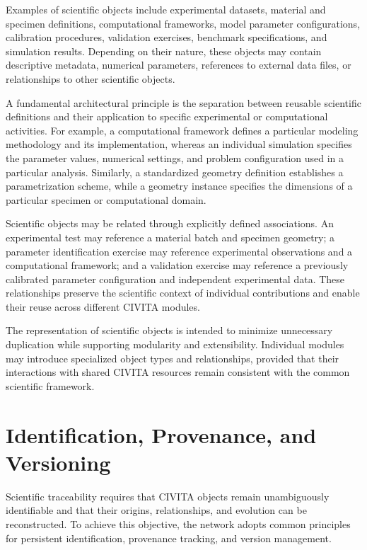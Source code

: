 Examples of scientific objects include experimental datasets, material and specimen definitions, computational frameworks, model parameter configurations, calibration procedures, validation exercises, benchmark specifications, and simulation results. Depending on their nature, these objects may contain descriptive metadata, numerical parameters, references to external data files, or relationships to other scientific objects.

A fundamental architectural principle is the separation between reusable scientific definitions and their application to specific experimental or computational activities. For example, a computational framework defines a particular modeling methodology and its implementation, whereas an individual simulation specifies the parameter values, numerical settings, and problem configuration used in a particular analysis. Similarly, a standardized geometry definition establishes a parametrization scheme, while a geometry instance specifies the dimensions of a particular specimen or computational domain.

Scientific objects may be related through explicitly defined associations. An experimental test may reference a material batch and specimen geometry; a parameter identification exercise may reference experimental observations and a computational framework; and a validation exercise may reference a previously calibrated parameter configuration and independent experimental data. These relationships preserve the scientific context of individual contributions and enable their reuse across different CIVITA modules.

The representation of scientific objects is intended to minimize unnecessary duplication while supporting modularity and extensibility. Individual modules may introduce specialized object types and relationships, provided that their interactions with shared CIVITA resources remain consistent with the common scientific framework.

\section{Identification, Provenance, and Versioning}

Scientific traceability requires that CIVITA objects remain unambiguously identifiable and that their origins, relationships, and evolution can be reconstructed. To achieve this objective, the network adopts common principles for persistent identification, provenance tracking, and version management.

